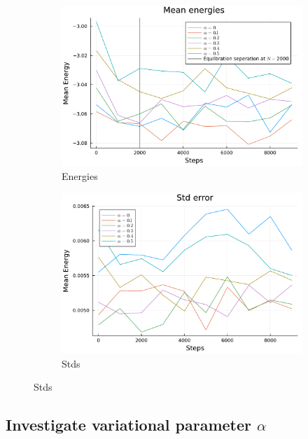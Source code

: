 \documentclass[
	a4paper, %
	10pt, %
]{CSUniSchoolLabReport}
\begin{document}
\begin{figure}[H]
	\begin{subfigure}[b]{0.49\textwidth}
		\centering
		\includegraphics[width=\textwidth]{../saves/task1b.energies.pdf}
		\caption{Energies}
	\end{subfigure}
	\hfill
	\begin{subfigure}[b]{0.49\textwidth}
		\centering
		\includegraphics[width=\textwidth]{../saves/task1b.stds.pdf}
		\caption{Stds}
	\end{subfigure}
\end{figure}

\subsection{Investigate variational parameter $\alpha$}
\end{document}
